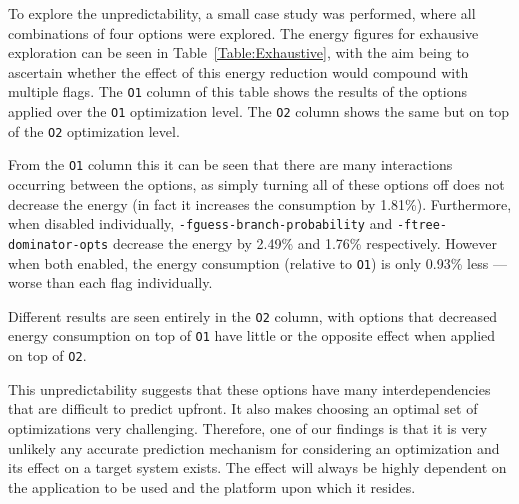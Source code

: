\documentclass[twocolumn]{article}
\begin{document}
To explore the unpredictability, a small case study was performed, where all combinations of four options were explored. The energy figures for exhausive exploration can be seen in Table~\ref{Table:Exhaustive}, with the aim being to ascertain whether the effect of this energy reduction would compound with multiple flags. The \texttt{O1} column of this table shows the results of the options applied over the \texttt{O1} optimization level. The \texttt{O2} column shows the same but on top of the \texttt{O2} optimization level.

From the \texttt{O1} column this it can be seen that there are many interactions occurring between the options, as simply turning all of these options off does not decrease the energy (in fact it increases the consumption by 1.81\%). Furthermore, when disabled individually, \texttt{-fguess-branch-probability} and \texttt{-ftree-dominator-opts} decrease the energy by 2.49\% and 1.76\% respectively. However when both enabled, the energy consumption (relative to \texttt{O1}) is only 0.93\% less --- worse than each flag individually.

Different results are seen entirely in the \texttt{O2} column, with options that decreased energy consumption on top of \texttt{O1} have little or the opposite effect when applied on top of \texttt{O2}.

This unpredictability suggests that these options have many interdependencies that are difficult to predict upfront. It also makes choosing an optimal set of optimizations very challenging. Therefore, one of our findings is that it is very unlikely any accurate prediction mechanism for considering an optimization and its effect on a target system exists. The effect will always be highly dependent on the application to be used and the platform upon which it resides.
\end{document}
